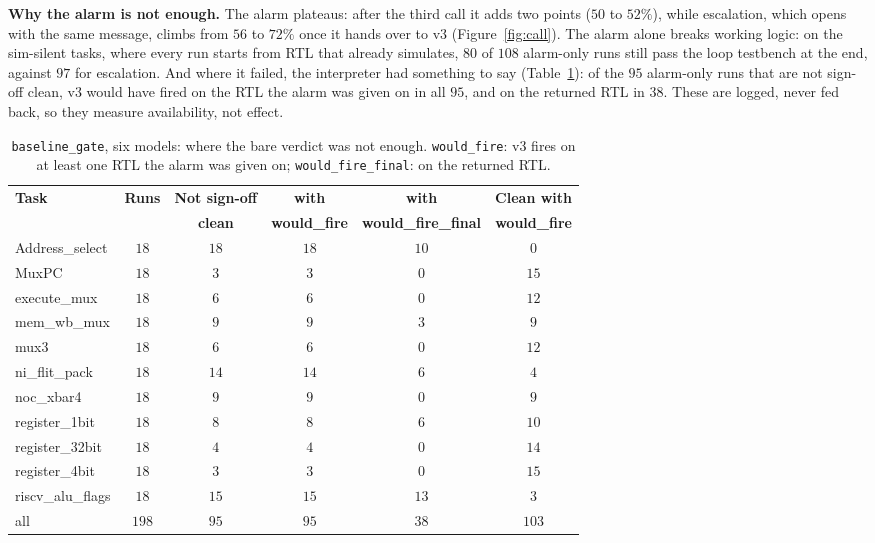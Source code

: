 \documentclass[11pt]{article}
\begin{document}
\textbf{Why the alarm is not enough.} The alarm plateaus: after the third call
it adds two points ($50$ to $52\%$), while escalation, which opens with the
same message, climbs from $56$ to $72\%$ once it hands over to v3
(Figure~\ref{fig:call}). The alarm alone breaks working logic: on the
sim-silent tasks, where every run starts from RTL that already simulates, $80$
of $108$ alarm-only runs still pass the loop testbench at the end, against $97$
for escalation. And where it failed, the interpreter had something to say
(Table~\ref{tab:wouldfire}): of the $95$ alarm-only runs that are not sign-off
clean, v3 would have fired on the RTL the alarm was given on in all $95$, and
on the returned RTL in $38$. These are logged, never fed back, so they measure
availability, not effect.

\begin{table}[htbp]
\centering
\caption{\texttt{baseline\_gate}, six models: where the bare verdict was not
enough. \texttt{would\_fire}: v3 fires on at least one RTL the alarm was given
on; \texttt{would\_fire\_final}: on the returned RTL.}
\label{tab:wouldfire}
\small
\begin{tabular}{@{}l c c c c c@{}}
\toprule
\textbf{Task} & \textbf{Runs} & \textbf{Not sign-off} & \textbf{with}           & \textbf{with}                  & \textbf{Clean with} \\
              &               & \textbf{clean}        & \textbf{would\_fire}    & \textbf{would\_fire\_final}    & \textbf{would\_fire} \\
\midrule
Address\_select   & $18$ & $18$ & $18$ & $10$ & $0$ \\
MuxPC             & $18$ & $3$  & $3$  & $0$  & $15$ \\
execute\_mux      & $18$ & $6$  & $6$  & $0$  & $12$ \\
mem\_wb\_mux      & $18$ & $9$  & $9$  & $3$  & $9$ \\
mux3              & $18$ & $6$  & $6$  & $0$  & $12$ \\
ni\_flit\_pack    & $18$ & $14$ & $14$ & $6$  & $4$ \\
noc\_xbar4        & $18$ & $9$  & $9$  & $0$  & $9$ \\
register\_1bit    & $18$ & $8$  & $8$  & $6$  & $10$ \\
register\_32bit   & $18$ & $4$  & $4$  & $0$  & $14$ \\
register\_4bit    & $18$ & $3$  & $3$  & $0$  & $15$ \\
riscv\_alu\_flags & $18$ & $15$ & $15$ & $13$ & $3$ \\
\midrule
all               & $198$ & $95$ & $95$ & $38$ & $103$ \\
\bottomrule
\end{tabular}
\end{table}
\end{document}
